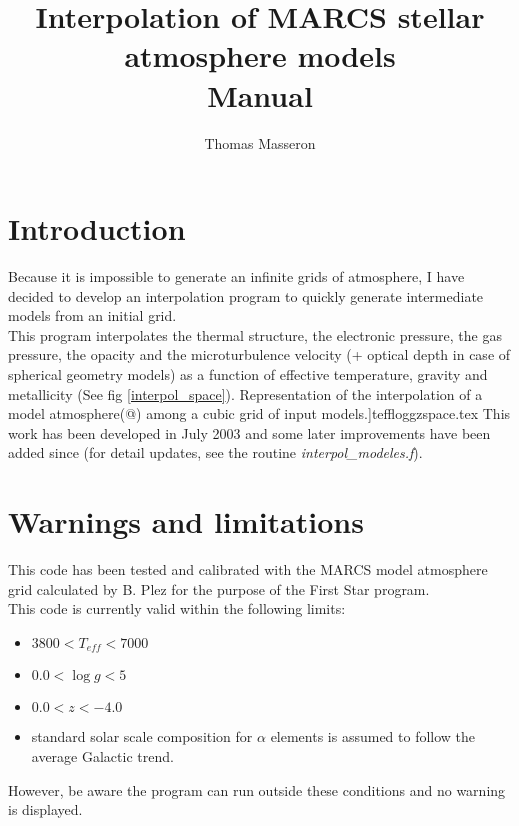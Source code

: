 \documentclass[11pt]{article}
\begin{document}
\begin{titlepage}
\center
\title{Interpolation of MARCS stellar atmosphere models\\
Manual}
\author{Thomas Masseron}
\maketitle
\end{titlepage} 

\section{Introduction}
Because it is impossible to generate an infinite grids of atmosphere, I have decided to develop an interpolation program to quickly generate intermediate models from an initial grid. \\
This program interpolates the thermal structure, the electronic pressure, the gas pressure, the opacity and the microturbulence velocity (+ optical depth in case  of spherical geometry models) as a function of effective temperature, gravity and metallicity (See fig \ref{interpol_space}).
{Representation of the interpolation of a model atmosphere(@) among a cubic grid of input models.}]{teffloggzspace.tex} \label{interpol_space}
This work has been developed in July 2003 and some later improvements have been added since (for detail updates, see the routine \textit{interpol\_modeles.f}).  

\section{Warnings and limitations}
This code has been tested and calibrated with the MARCS model atmosphere grid calculated by B. Plez for the purpose of the First Star program.\\
This code is currently valid within the following limits:
\begin{itemize}
\item $3800<T_{eff}<7000$
\item $0.0<\log g<5$
\item $0.0 <z< -4.0$
\item standard solar scale composition for $\alpha$ elements is assumed to follow the average Galactic trend.
\end{itemize} 
However, be aware the program can run outside these conditions and no warning is displayed. 
\end{document}
